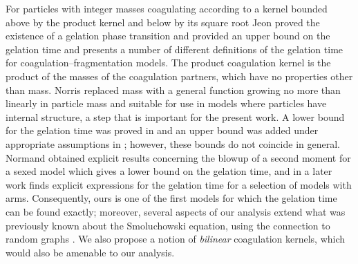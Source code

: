 \documentclass[11pt, notitlepage]{article}
\begin{document}
For particles with integer masses coagulating according to a kernel bounded above by the product kernel and below by its square root Jeon \cite{J98} proved the existence of a gelation phase transition and provided an upper bound on the gelation time and presents a number of different definitions of the gelation time for coagulation--fragmentation models.
The product coagulation kernel is the product of the masses of the coagulation partners, which have no properties other than mass.
Norris \cite{N99,N00} replaced mass with a general function growing no more than linearly in particle mass and suitable for use in models where particles have internal structure, a step that is important for the present work.
A lower bound for the gelation time was proved in \cite{N99} and an upper bound was added under appropriate assumptions in \cite{N00}; however, these bounds do not coincide in general. Normand \cite{Nm09} obtained explicit results concerning the blowup of a second moment for a sexed model which gives a lower bound on the gelation time, and in a later work \cite{Nm11} finds explicit expressions for the gelation time for a selection of models with arms.  Consequently, ours is one of the first models for which the gelation time can be found exactly; moreover, several aspects of our analysis extend what was previously known about the Smoluchowski equation, using the connection to random graphs \cite{BJR07}. We also propose a notion of \emph{bilinear} coagulation kernels, which would also be amenable to our analysis.

\end{document}
